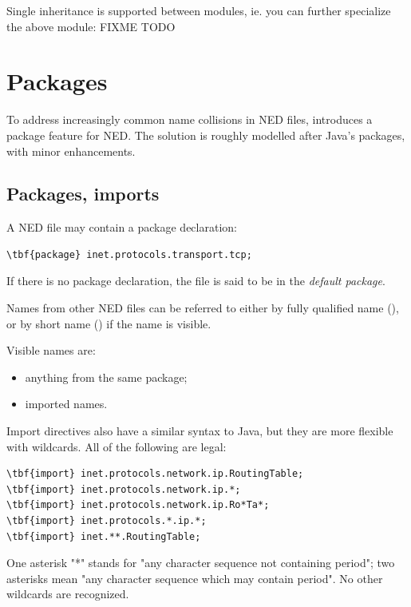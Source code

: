 Single inheritance is supported between modules, ie. you can further
specialize the above module:
FIXME TODO

\section{Packages}

To address increasingly common name collisions in NED files,
 introduces a package feature for NED. The solution
is roughly modelled after Java's packages, with minor enhancements.


\subsection{Packages, imports}

A NED file may contain a package declaration:

\begin{Verbatim}[commandchars=\\\{\}]
\tbf{package} inet.protocols.transport.tcp;
\end{Verbatim}

If there is no package declaration, the file is said to be in the
\textit{default package}.

Names from other NED files can be referred to either by fully qualified
name (), or by short name
() if the name is visible.

Visible names are:
\begin{itemize}
  \item anything from the same package;
  \item imported names.
\end{itemize}

Import directives also have a similar syntax to Java, but they
are more flexible with wildcards. All of the following are legal:

\begin{Verbatim}[commandchars=\\\{\}]
\tbf{import} inet.protocols.network.ip.RoutingTable;
\tbf{import} inet.protocols.network.ip.*;
\tbf{import} inet.protocols.network.ip.Ro*Ta*;
\tbf{import} inet.protocols.*.ip.*;
\tbf{import} inet.**.RoutingTable;
\end{Verbatim}

One asterisk "*" stands for "any character sequence not containing
period"; two asterisks mean "any character sequence which may
contain period". No other wildcards are recognized.

